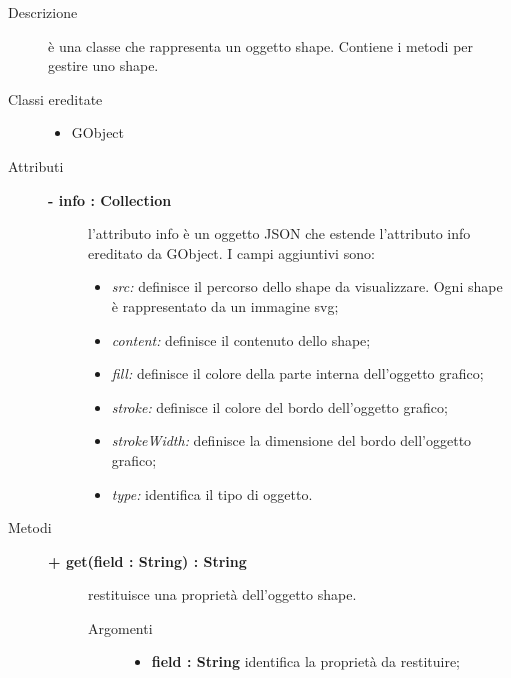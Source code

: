 \begin{description}
\item[Descrizione] \hfill
	è una classe che rappresenta un oggetto shape. Contiene i metodi per gestire uno shape.
	
\item[Classi ereditate] \hfill
	\begin{itemize}
		\item GObject
	\end{itemize}
	
\item[Attributi] \hfill
	\begin{description}
		\item[\textbf{- info : Collection			}] \hfill
			l'attributo info è un oggetto JSON che estende l'attributo info ereditato da GObject. I campi aggiuntivi sono:
	\begin{itemize}
		\item \textit{src:} definisce il percorso dello shape da visualizzare. Ogni shape è rappresentato da un immagine svg;
		\item \textit{content:} definisce il contenuto dello shape;		
		\item \textit{fill:} definisce il colore della parte interna dell'oggetto grafico; %
        \item \textit{stroke:} definisce il colore del bordo dell'oggetto grafico; %
        \item \textit{strokeWidth:} definisce la dimensione del bordo dell'oggetto grafico; %
		\item \textit{type:} identifica il tipo di oggetto.		
	\end{itemize}
	\end{description}
	
\item[Metodi] \hfill

\begin{description}
		\item[\textbf{\color{blue}+ get(field : String) : String			}] \hfill
			restituisce una proprietà dell'oggetto shape.
			
		\begin{description}
			\item[Argomenti] \hfill
				\begin{itemize}
				
					\item \textbf{field : String			} \hfill
					identifica la proprietà da restituire;
				\end{itemize}
		\end{description}


\end{description}
\end{description}
